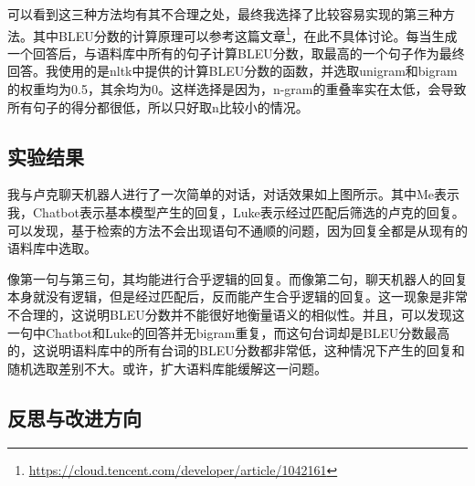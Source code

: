 \documentclass[12pt]{article} %
\begin{document}
\begin{sloppypar}
可以看到这三种方法均有其不合理之处，最终我选择了比较容易实现的第三种方法。其中BLEU分数的计算原理可以参考这篇文章\footnote{\url{https://cloud.tencent.com/developer/article/1042161}}，在此不具体讨论。每当生成一个回答后，与语料库中所有的句子计算BLEU分数，取最高的一个句子作为最终回答。我使用的是nltk中提供的计算BLEU分数的函数，并选取unigram和bigram的权重均为0.5，其余均为0。这样选择是因为，n-gram的重叠率实在太低，会导致所有句子的得分都很低，所以只好取n比较小的情况。

\subsection{实验结果}


我与卢克聊天机器人进行了一次简单的对话，对话效果如上图所示。其中Me表示我，Chatbot表示基本模型产生的回复，Luke表示经过匹配后筛选的卢克的回复。可以发现，基于检索的方法不会出现语句不通顺的问题，因为回复全都是从现有的语料库中选取。

像第一句与第三句，其均能进行合乎逻辑的回复。而像第二句，聊天机器人的回复本身就没有逻辑，但是经过匹配后，反而能产生合乎逻辑的回复。这一现象是非常不合理的，这说明BLEU分数并不能很好地衡量语义的相似性。并且，可以发现这一句中Chatbot和Luke的回答并无bigram重复，而这句台词却是BLEU分数最高的，这说明语料库中的所有台词的BLEU分数都非常低，这种情况下产生的回复和随机选取差别不大。或许，扩大语料库能缓解这一问题。

\subsection{反思与改进方向}


\end{sloppypar}
\end{document}
